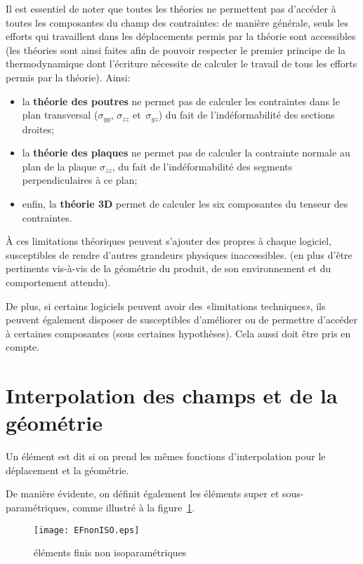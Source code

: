 \medskip
Il est essentiel de noter que toutes les théories ne permettent pas d'accéder à toutes les composantes du champ des contraintes: de manière générale, seuls les efforts qui travaillent dans les déplacements permis par la théorie sont accessibles (les théories sont ainsi faites afin de pouvoir respecter le premier principe de la thermodynamique dont l'écriture nécessite de calculer le travail de tous les efforts permis par la théorie). Ainsi:
\begin{itemize}
  \item la \textbf{théorie des poutres} ne permet pas de calculer les contraintes dans le plan transversal ($\sigma_{yy}$, $\sigma_{zz}$ et~$\sigma_{yz}$) du fait de l'indéformabilité des sections droites;
  \item la \textbf{théorie des plaques} ne permet pas de calculer la contrainte normale au plan de la plaque $\sigma_{zz}$, du fait de l'indéformabilité des segments perpendiculaires à ce plan;
  \item enfin, la \textbf{théorie 3D} permet de calculer les six composantes du tenseur des contraintes.
\end{itemize}

\medskip
À ces limitations théoriques peuvent s'ajouter des  propres à chaque logiciel, susceptibles de rendre d'autres grandeurs physiques inaccessibles.  (en plus d'être pertinents vis-à-vis de la géométrie du produit, de son environnement et du comportement attendu).

De plus, si certains logiciels peuvent avoir des «limitations techniques», ils peuvent également disposer de  susceptibles d'améliorer ou de permettre d'accéder à certaines composantes (sous certaines hypothèses). Cela aussi doit être pris en compte.

\medskip%

\medskip
\section{Interpolation des champs et de la géométrie}

Un élément est dit  si on prend les mêmes fonctions d'interpolation pour le déplacement et la géométrie.

De manière évidente, on définit également les éléments super et sous-paramétriques, comme illustré à la figure~\ref{EFnonISO}.
\begin{figure}[ht]
\centering
\texttt{[image: EFnonISO.eps]}
\caption{\label{EFnonISO} éléments finis non isoparamétriques}
\end{figure}

